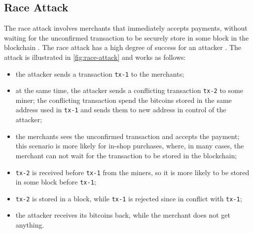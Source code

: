 \subsection{Race Attack}
The race attack involves merchants that immediately accepts payments, without waiting for the unconfirmed transaction to be securely store in some block in the blockchain \cite{bitcoin_wiki_irreversible_transactions}.
The race attack has a high degree of success for an attacker \cite{double_spending_two_for_one}.
The attack is illustrated in \cref{fig:race-attack} and works as follows:
\begin{itemize}
	\item the attacker sends a transaction \texttt{tx-1} to the merchants;
	\item at the same time, the attacker sends a conflicting transaction \texttt{tx-2} to some miner; the conflicting transaction spend the bitcoins stored in the same address used in \texttt{tx-1} and sends them to new address in control of the attacker;
	\item the merchants sees the unconfirmed transaction and accepts the payment; this scenario is more likely for in-shop purchases, where, in many cases, the merchant can not wait for the transaction to be stored in the blockchain;
	\item \texttt{tx-2} is received before \texttt{tx-1} from the miners, so it is more likely to be stored in some block before \texttt{tx-1};
	\item \texttt{tx-2} is stored in a block, while \texttt{tx-1} is rejected since in conflict with \texttt{tx-1};
	\item the attacker receives its bitcoins back, while the merchant does not get anything.
\end{itemize}

